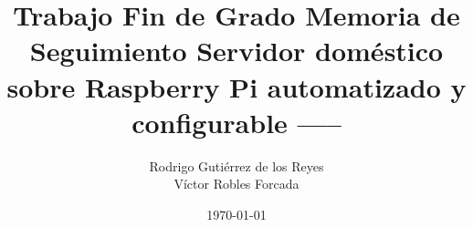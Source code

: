 \newcommand{\setTitle}{ Trabajo Fin de Grado }
\newcommand{\setSubTitle}{ Memoria de Seguimiento }
\newcommand{\setSubSubTitle}{ Servidor doméstico sobre Raspberry Pi automatizado y configurable }

\newcommand{\setAuthor}{ Rodrigo Gutiérrez de los Reyes }
\newcommand{\setTutor}{ Víctor Robles Forcada }
\newcommand{\setDepartment}{ Arquitectura y Tecnología de Sistemas Informáticos }
\newcommand{\setDegree}{ Ingeniería Informática }

\newcommand{\setDate}{ \today }

\title{
    \vspace{35px}
    \Huge \setTitle \vspace{25px} \break
    \Large \setSubTitle \vspace{25px} \break
    \large \setSubSubTitle \vspace{35px} \break
    \Large ----- \vspace{150px} \break
    \Large \vspace{5px} \break
}
\author{
    \large \setAuthor \vspace{10px} \break
    \\
    \large \setTutor \vspace{50px} \break
}
\date{ \setDate }
